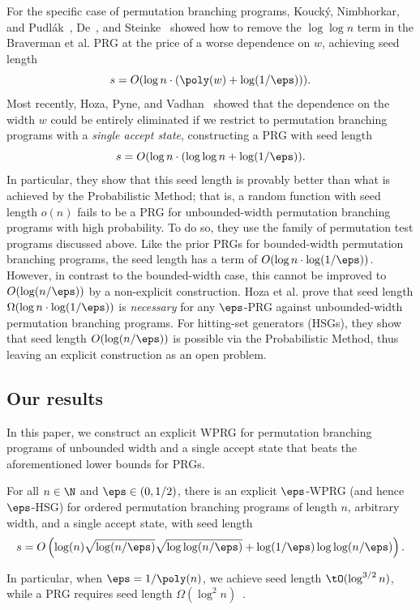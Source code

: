 \documentclass{toc}
\begin{document}
	For the specific case of permutation branching programs, Kouck{\'y}, Nimbhorkar, and Pudl{\'a}k~\cite{KouckyNiPu11}, De~\cite{De11}, and Steinke~\cite{Steinke12}
	showed how to remove the $\log\log n$ term in the Braverman et al. PRG at the price of a worse dependence on $w$, achieving seed length
	$$s=O(\log n\cdot(\poly(w)+\log(1/\eps))).$$
	Most recently, Hoza, Pyne, and Vadhan~\cite{HozaPyVa21} showed that the dependence on the width $w$ could be entirely eliminated if we restrict to permutation branching programs with a \emph{single accept state}, constructing a PRG with seed length
	$$s=O(\log n\cdot (\log\log n+\log(1/\eps)).$$
	In particular, they show that this	seed length is provably better than what is achieved by the Probabilistic Method; that is, a random function with seed length $o(n)$ fails to be a PRG for unbounded-width permutation branching programs with high probability. To do so, they use the family of permutation test programs discussed above.
	Like the prior PRGs for bounded-width permutation branching programs, the seed length has a term of $O(\log n\cdot \log(1/\eps))$.  However, in contrast to the bounded-width case, this cannot be improved to $O(\log(n/\eps))$ by a non-explicit construction.  Hoza et al. prove that seed length $\Omega(\log n \cdot \log(1/\eps))$ is \emph{necessary} for any $\eps$-PRG against unbounded-width permutation branching programs.  For hitting-set generators (HSGs), they show that seed length $O(\log(n/\eps))$ is possible via the Probabilistic Method, thus leaving an explicit construction as an open problem. 
	
\subsection{Our results}
In this paper, we construct an explicit WPRG for permutation branching programs of unbounded width and a single accept state that beats the aforementioned lower bounds for PRGs. %

\begin{theorem}
\label{thm:cycle}
For all $n\in \N$ and $\eps \in (0,1/2)$, there is an explicit $\eps$-WPRG (and hence $\eps$-HSG) for ordered permutation branching 
programs of length $n$, arbitrary width, and a single accept state, with seed length
$$s=O\left(\log(n)\sqrt{\log(n/\eps)}\sqrt{\log\log(n/\eps)}+\log(1/\eps)\log\log(n/\eps)\right).$$
\end{theorem}
In particular, when $\eps=1/\poly(n)$, we achieve seed length $\tO(\log^{3/2} n)$, while
a PRG requires seed length $\Omega(\log^2 n)$~\cite{HozaPyVa21}.
\end{document}
